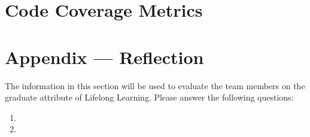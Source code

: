 \documentclass[12pt, titlepage]{article}
\begin{document}
\newpage

\section{Code Coverage Metrics}




\newpage{}
\section*{Appendix --- Reflection}

The information in this section will be used to evaluate the team members on the
graduate attribute of Lifelong Learning.  Please answer the following questions:

\begin{enumerate}
  \item 
  \item 
\end{enumerate}
\end{document}

